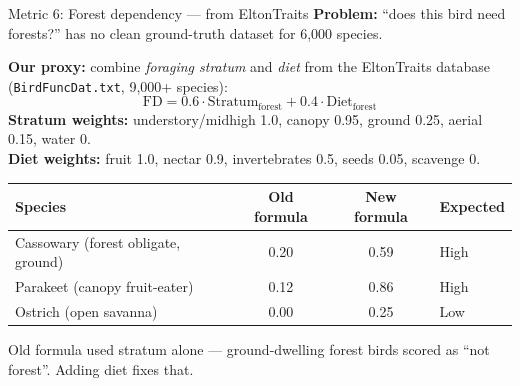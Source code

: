 \documentclass[aspectratio=169]{beamer}
\begin{document}
\begin{frame}{Metric 6: Forest dependency --- from EltonTraits}
  \textbf{Problem:} ``does this bird need forests?'' has no clean ground-truth dataset for 6{,}000 species.
  \vspace{0.4em}

  \textbf{Our proxy:} combine \emph{foraging stratum} and \emph{diet} from the EltonTraits database (\texttt{BirdFuncDat.txt}, 9{,}000+ species):
  \[
    \text{FD} = 0.6 \cdot \text{Stratum}_\text{forest} + 0.4 \cdot \text{Diet}_\text{forest}
  \]
  \small
  \textbf{Stratum weights:} understory/midhigh 1.0, canopy 0.95, ground 0.25, aerial 0.15, water 0.\\
  \textbf{Diet weights:} fruit 1.0, nectar 0.9, invertebrates 0.5, seeds 0.05, scavenge 0.
  \vspace{0.4em}

  \begin{center}
  \small
  \begin{tabular}{lccl}
    \toprule
    Species & Old formula & New formula & Expected \\
    \midrule
    Cassowary (forest obligate, ground)  & 0.20 & \alert{0.59} & High \\
    Parakeet (canopy fruit-eater)        & 0.12 & \alert{0.86} & High \\
    Ostrich (open savanna)               & 0.00 & \alert{0.25} & Low \\
    \bottomrule
  \end{tabular}
  \end{center}
  \footnotesize Old formula used stratum alone --- ground-dwelling forest birds scored as ``not forest''. Adding diet fixes that.
\end{frame}
\end{document}
